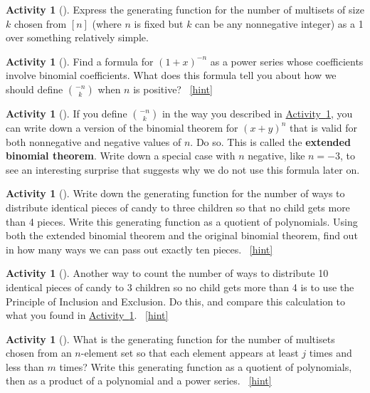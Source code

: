 \documentclass[10pt,]{book}
\newcommand{\terminology}[1]{\textbf{#1}}
\theoremstyle{plain}
\theoremstyle{definition}
\theoremstyle{definition}
\theoremstyle{definition}
\newtheorem{activity}[project]{Activity}
\numberwithin{equation}{chapter}
\begin{document}
\begin{activity}[]\label{multisetgenfn}
\hypertarget{p-897}{}%
Express the generating function for the number of multisets of size \(k\) chosen from \([n]\) (where \(n\) is fixed but \(k\) can be any nonnegative integer) as a 1 over something relatively simple.%
\end{activity}
\begin{activity}[]\label{negnchoosek}
\hypertarget{p-900}{}%
Find a formula for \((1+x)^{-n}\) as a power series whose coefficients involve binomial coefficients. What does this formula tell you about how we should define \(\binom{-n}{k}\) when \(n\) is positive?%
~\hfill{\tiny\hyperlink{a-191}{[hint]}\hypertarget{q-191}{}}\end{activity}
\begin{activity}[]\label{activity-192}
\hypertarget{p-904}{}%
If you define \(\binom{-n}{k}\) in the way you described in \hyperref[negnchoosek]{Activity~\ref{negnchoosek}}, you can write down a version of the binomial theorem for \((x+y)^n\) that is valid for both nonnegative and negative values of \(n\). Do so. This is called the \terminology{extended binomial theorem}. Write down a special case with \(n\) negative, like \(n=-3\), to see an interesting surprise that suggests why we do not use this formula later on.%
\end{activity}
\begin{activity}[]\label{candygenfn}
\hypertarget{p-906}{}%
Write down the generating function for the number of ways to distribute identical pieces of candy to three children so that no child gets more than 4 pieces. Write this generating function as a quotient of polynomials. Using both the extended binomial theorem and the original binomial theorem, find out in how many ways we can pass out exactly ten pieces.%
~\hfill{\tiny\hyperlink{a-193}{[hint]}\hypertarget{q-193}{}}\end{activity}
\begin{activity}[]\label{activity-194}
\hypertarget{p-911}{}%
Another way to count the number of ways to distribute 10 identical pieces of candy to 3 children so no child gets more than 4 is to use the Principle of Inclusion and Exclusion.  Do this, and compare this calculation to what you found in \hyperref[candygenfn]{Activity~\ref{candygenfn}}.%
~\hfill{\tiny\hyperlink{a-194}{[hint]}\hypertarget{q-194}{}}\end{activity}
\begin{activity}[]\label{activity-195}
\hypertarget{p-914}{}%
What is the generating function for the number of multisets chosen from an \(n\)-element set so that each element appears at least \(j\) times and less than \(m\) times? Write this generating function as a quotient of polynomials, then as a product of a polynomial and a power series.%
~\hfill{\tiny\hyperlink{a-195}{[hint]}\hypertarget{q-195}{}}\end{activity}
\typeout{************************************************}
\typeout{************************************************}
\end{document}
